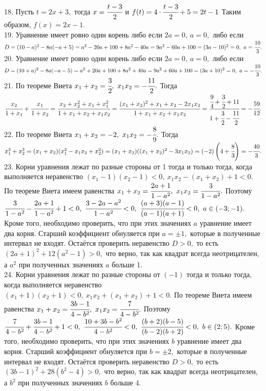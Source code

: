 18. Пусть $t=2x+3,$ тогда $x=\cfrac{t-3}{2}$ и $f(t)=4\cdot\cfrac{t-3}{2}+5=2t-1$ Таким образом, $f(x)=2x-1.$\\
19. Уравнение имеет ровно один корень либо если $2a=0,\ a=0,$ либо если $D=(10-a)^2-8a(-a+5)=a^2-20a+100+8a^2-40a=9a^2-60a+100=(3a-10)^2=0,\ a=\cfrac{10}{3}.$\\
20. Уравнение имеет ровно один корень либо если $2a=0,\ a=0,$ либо если $D=(10+a)^2-8a(-a-5)=a^2+20a+100+8a^2+40a=9a^2+60a+100=(3a+10)^2=0,\ a=-\cfrac{10}{3}.$\\
21. По теореме Виета $x_1+x_2=\cfrac{3}{2},\ x_1x_2=-\cfrac{11}{2}.$ Тогда $\cfrac{x_2}{1+x_1}+\cfrac{x_1}{1+x_2}=\cfrac{x_2+x_2^2+x_1+x_1^2}{1+x_1+x_2+x_1x_2}=
\cfrac{(x_1+x_2)^2+x_1+x_2-2x_1x_2}{1+x_1+x_2+x_1x_2}=\cfrac{\cfrac{9}{4}+\cfrac{3}{2}+11}{1+\cfrac{3}{2}-\cfrac{11}{2}}=-\cfrac{59}{12}.$\\
22. По теореме Виета $x_1+x_2=-2,\ x_1x_2=-\cfrac{8}{9}.$ Тогда $x_1^3+x_2^3=(x_1+x_2)(x_1^2-x_1x_2+x_2^2)=(x_1+x_2)((x_1+x_2)^2-3x_1x_2)=(-2)\left(4+\cfrac{8}{3}\right)=-\cfrac{40}{3}.$\\
23. Корни уравнения лежат по разные стороны от 1 тогда и только тогда, когда выполняется неравенство $(x_1-1)(x_2-1)<0,\ x_1x_2-(x_1+x_2)+1<0.$ По теореме Виета имеем равенства $x_1+x_2=\cfrac{2a+1}{1-a^2},\ x_1x_2=\cfrac{3}{1-a^2}.$ Поэтому $\cfrac{3}{1-a^2}-\cfrac{2a+1}{1-a^2}+1<0,\
\cfrac{3-2a-a^2}{1-a^2}<0,\ \cfrac{(a+3)(a-1)}{(a-1)(a+1)}<0,\ a\in(-3;-1).$ Кроме того, необходимо проверить, что при этих значениях $a$ уравнение имеет два корня. Старший коэффициент обнуляется при $a=\pm1,$ которые в полученные интервал не входят. Остаётся проверить неравенство $D>0,$ то есть $(2a+1)^2+12(a^2-1)>0,$ что верно, так как квадрат всегда неотрицателен, а $a^2$ при полученных значениях $a$ больше 1.\\
24. Корни уравнения лежат по разные стороны от $(-1)$ тогда и только тогда, когда выполняется неравенство $(x_1+1)(x_2+1)<0,\ x_1x_2+(x_1+x_2)+1<0.$ По теореме Виета имеем равенства $x_1+x_2=\cfrac{3b-1}{4-b^2},\ x_1x_2=\cfrac{7}{4-b^2}.$ Поэтому $\cfrac{7}{4-b^2}+\cfrac{3b-1}{4-b^2}+1<0,\
\cfrac{10+3b-b^2}{4-b^2}<0,\ \cfrac{(b+2)(b-5)}{(b-2)(b+2)}<0,\ b\in(2;5).$ Кроме того, необходимо проверить, что при этих значениях $b$ уравнение имеет два корня. Старший коэффициент обнуляется при $b=\pm2,$ которые в полученные интервал не входят. Остаётся проверить неравенство $D>0,$ то есть $(3b-1)^2+28(b^2-4)>0,$ что верно, так как квадрат всегда неотрицателен, а $b^2$ при полученных значениях $b$ больше 4.\\
